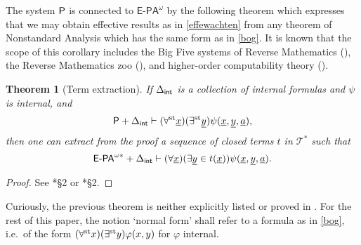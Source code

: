 \documentclass[reqno]{amsart}
\newtheorem{thm}{Theorem}
\newcommand\be{\begin{equation}}
\newcommand\ee{\end{equation}}
\def\P{\textup{\textsf{P}}}
\def\st{\textup{st}}
\def\INT{\textup{\textsf{int}}}
\numberwithin{equation}{section}
\numberwithin{thm}{section}
\begin{document}
\medskip

The system $\P$ is connected to $\textsf{E-PA}^{\omega}$ by the following theorem which expresses that we may obtain effective results as in \eqref{effewachten} from any theorem of Nonstandard Analysis which has the same form as in \eqref{bog}.  It is known that the scope of this corollary includes the Big Five systems of Reverse Mathematics (\cite{sambon}), the Reverse Mathematics zoo (\cite{samzoo, samzooII}), and higher-order computability theory (\cite{samGH}).  %
\begin{thm}[Term extraction]\label{consresultcor}
If $\Delta_{\INT}$ is a collection of internal formulas and $\psi$ is internal, and
\be\label{bog}
\P + \Delta_{\INT} \vdash (\forall^{\st}\underline{x})(\exists^{\st}\underline{y})\psi(\underline{x},\underline{y}, \underline{a}), 
\ee
then one can extract from the proof a sequence of closed terms $t$ in $\mathcal{T}^{*}$ such that
\be\label{effewachten}
\textup{\textsf{E-PA}}^{\omega*} + \Delta_{\INT} \vdash (\forall \underline{x})(\exists \underline{y}\in t(\underline{x}))\psi(\underline{x},\underline{y},\underline{a}).
\ee
\end{thm}
\begin{proof}
See \cite{samGH}*{\S2} or \cite{sambon}*{\S2}.
\end{proof}
Curiously, the previous theorem is neither explicitly listed or proved in \cite{brie}.
For the rest of this paper, the notion `normal form' shall refer to a formula as in \eqref{bog}, i.e.\ of the form $(\forall^{\st}x)(\exists^{\st}y)\varphi(x,y)$ for $\varphi$ internal.  

\medskip
\end{document}
